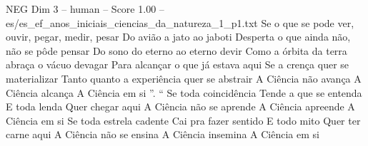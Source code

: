 \begin{textsample}{NEG Dim 3 – human – Score 1.00 – es/es\_ef\_anos\_iniciais\_ciencias\_da\_natureza\_1\_p1.txt}  \label{ex:f3_neg_019}
Se o que se pode ver, ouvir, pegar, medir, pesar Do avião a jato ao jaboti Desperta o que ainda não, não se pôde pensar Do sono do eterno ao eterno devir Como a órbita da terra abraça o vácuo devagar Para alcançar o que já estava aqui Se a crença quer se materializar Tanto quanto a experiência quer se abstrair A Ciência não avança A Ciência alcança A Ciência em si ”. “ Se toda coincidência Tende a que se entenda E toda lenda Quer chegar aqui A Ciência não se aprende A Ciência apreende A Ciência em si Se toda estrela cadente Cai pra fazer sentido E todo mito Quer ter carne aqui A Ciência não se ensina A Ciência insemina A Ciência em si

\end{textsample}
